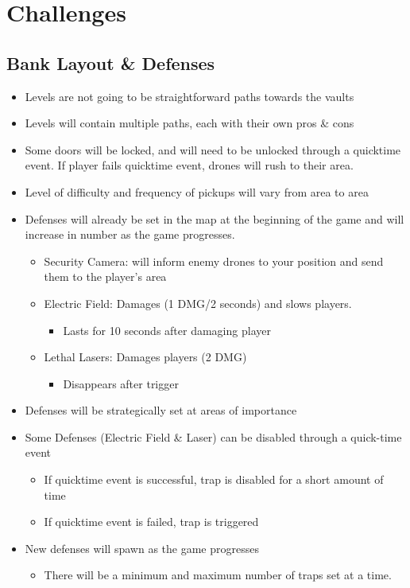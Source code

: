 \documentclass[10pt]{report}
\begin{document}
\section{Challenges}    

\subsection{Bank Layout \& Defenses}

\begin{itemize}
    \item Levels are not going to be straightforward paths towards the vaults
    \item Levels will contain multiple paths, each with their own pros \& cons
    \item Some doors will be locked, and will need to be unlocked through a quicktime event. If player fails quicktime event, drones will rush to their area.
    \item Level of difficulty and frequency of pickups will vary from area to area
    \item Defenses will already be set in the map at the beginning of the game and will increase in number as the game progresses.
    \begin{itemize}
        \item Security Camera: will inform enemy drones to your position and send them to the player’s area
        \item Electric Field: Damages (1 DMG/2 seconds) and slows players.
        \begin{itemize}
            \item Lasts for 10 seconds after damaging player
        \end{itemize}
        \item Lethal Lasers: Damages players (2 DMG)
        \begin{itemize}
            \item Disappears after trigger
        \end{itemize}
    \end{itemize}
    \item Defenses will be strategically set at areas of importance
    \item Some Defenses (Electric Field \& Laser) can be disabled through a quick-time event
    \begin{itemize}
        \item If quicktime event is successful, trap is disabled for a short amount of time
        \item If quicktime event is failed, trap is triggered
    \end{itemize}
    \item New defenses will spawn as the game progresses
    \begin{itemize}
        \item There will be a minimum and maximum number of traps set at a time.
    \end{itemize}
\end{itemize}
\end{document}
